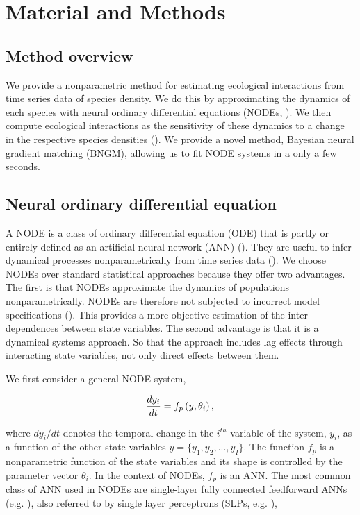 \documentclass[11pt, oneside]{article}
\begin{document}
\section{Material and Methods}

\subsection{Method overview}

We provide a nonparametric method for estimating ecological interactions from time series data of species density. 
We do this by approximating the dynamics of each species with neural ordinary differential equations (NODEs, \cite{Bonnaffe2021a}). 
We then compute ecological interactions as the sensitivity of these dynamics to a change in the respective species densities (\cite{Sugihara2012,Bonnaffe2021a}).
We provide a novel method, Bayesian neural gradient matching (BNGM), allowing us to fit NODE systems in a only a few seconds.

\subsection{Neural ordinary differential equation}

A NODE is a class of ordinary differential equation (ODE) that is partly or entirely defined as an artificial neural network (ANN) (\cite{Chen2018}).
They are useful to infer dynamical processes nonparametrically from time series data (\cite{Bonnaffe2021a}).
We choose NODEs over standard statistical approaches because they offer two advantages. 
The first is that NODEs approximate the dynamics of populations nonparametrically.
NODEs are therefore not subjected to incorrect model specifications (\cite{Jost2000,Adamson2013}).
This provides a more objective estimation of the inter-dependences between state variables. 
The second advantage is that it is a dynamical systems approach. 
So that the approach includes lag effects through interacting state variables, not only direct effects between them. 

We first consider a general NODE system,

\vspace{-0.5cm}
\begin{equation}
    \frac{dy_i}{dt} = f_p \left(y,\theta_i \right), \\
\end{equation}

where $dy_i/dt$ denotes the temporal change in the $i^{th}$ variable of the system, $y_i$, as a function of the other state variables $y = \{ y_1, y_2, ..., y_I\}$.
The function $f_p$ is a nonparametric function of the state variables and its shape is controlled by the parameter vector $\theta_i$.
In the context of NODEs, $f_p$ is an ANN.
The most common class of ANN used in NODEs are single-layer fully connected feedforward ANNs (e.g. \cite{Wu2005}), also referred to by single layer perceptrons (SLPs, e.g. \cite{Bonnaffe2021a}),
\end{document}
